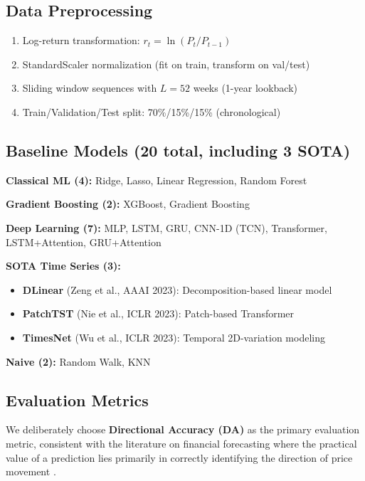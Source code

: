 \documentclass[3p,times]{elsarticle}
\begin{document}
\subsection{Data Preprocessing}

\begin{enumerate}
\item Log-return transformation: $r_t = \ln(P_t / P_{t-1})$
\item StandardScaler normalization (fit on train, transform on val/test)
\item Sliding window sequences with $L = 52$ weeks (1-year lookback)
\item Train/Validation/Test split: 70\%/15\%/15\% (chronological)
\end{enumerate}

\subsection{Baseline Models (20 total, including 3 SOTA)}
\label{sec:baselines}

\textbf{Classical ML (4):} Ridge, Lasso, Linear Regression, Random Forest

\textbf{Gradient Boosting (2):} XGBoost, Gradient Boosting

\textbf{Deep Learning (7):} MLP, LSTM, GRU, CNN-1D (TCN), Transformer, LSTM+Attention, GRU+Attention

\textbf{SOTA Time Series (3):}
\begin{itemize}
\item \textbf{DLinear} (Zeng et al., AAAI 2023): Decomposition-based linear model
\item \textbf{PatchTST} (Nie et al., ICLR 2023): Patch-based Transformer
\item \textbf{TimesNet} (Wu et al., ICLR 2023): Temporal 2D-variation modeling
\end{itemize}

\textbf{Naive (2):} Random Walk, KNN

\subsection{Evaluation Metrics}

We deliberately choose \textbf{Directional Accuracy (DA)} as the primary evaluation metric, consistent with the literature on financial forecasting where the practical value of a prediction lies primarily in correctly identifying the direction of price movement \cite{pesaran1992,leitch1991}.
\end{document}
